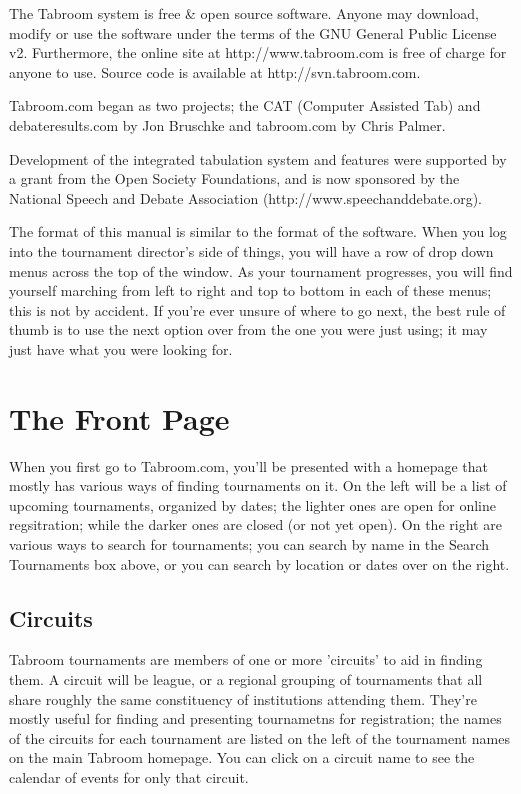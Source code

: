 \documentclass[12pt]{report}
\begin{document}
The Tabroom system is free \& open source software.  Anyone may download,
modify or use the software under the terms of the GNU General Public License
v2.  Furthermore, the online site at http://www.tabroom.com is free of charge
for anyone to use.  Source code is available at http://svn.tabroom.com.

Tabroom.com began as two projects; the CAT (Computer Assisted Tab) and
debateresults.com by Jon Bruschke and tabroom.com by Chris Palmer.

Development of the integrated tabulation system and features were supported by
a grant from the Open Society Foundations, and is now sponsored by the National
Speech and Debate Association (http://www.speechanddebate.org).

\medskip

The format of this manual is similar to the format of the software.  When you
log into the tournament director's side of things, you will have a row of drop
down menus across the top of the window.    As your tournament progresses, you
will find yourself marching from left to right and top to bottom in each of
these menus; this is not by accident.   If you're ever unsure of where to go
next, the best rule of thumb is to use the next option over from the one you
were just using; it may just have what you were looking for.

\chapter{The Front Page} 

	When you first go to Tabroom.com, you'll be presented with a homepage that
	mostly has various ways of finding tournaments on it.  On the left will be
	a list of upcoming tournaments, organized by dates; the lighter ones are
	open for online regsitration; while the darker ones are closed (or not yet
	open).  On the right are various ways to search for tournaments; you can
	search by name in the Search Tournaments box above, or you can search by
	location or dates over on the right.

	\section{Circuits}

	Tabroom tournaments are members of one or more 'circuits' to aid in finding
	them.  A circuit will be league, or a regional grouping of tournaments that
	all share roughly the same constituency of institutions attending them.
	They're mostly useful for finding and presenting tournametns for
	registration; the names of the circuits for each tournament are listed on
	the left of the tournament names on the main Tabroom homepage.  You can
	click on a circuit name to see the calendar of events for only that
	circuit.
\end{document}

